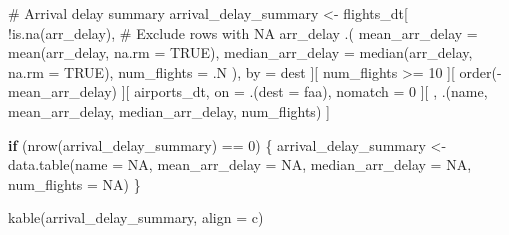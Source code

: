 \documentclass[
  12pt,
]{article}
\newenvironment{Shaded}{\begin{snugshade}}{\end{snugshade}}
\newcommand{\AttributeTok}[1]{\textcolor[rgb]{0.40,0.45,0.13}{#1}}
\newcommand{\CommentTok}[1]{\textcolor[rgb]{0.37,0.37,0.37}{#1}}
\newcommand{\ConstantTok}[1]{\textcolor[rgb]{0.56,0.35,0.01}{#1}}
\newcommand{\ControlFlowTok}[1]{\textcolor[rgb]{0.00,0.23,0.31}{\textbf{#1}}}
\newcommand{\DecValTok}[1]{\textcolor[rgb]{0.68,0.00,0.00}{#1}}
\newcommand{\FunctionTok}[1]{\textcolor[rgb]{0.28,0.35,0.67}{#1}}
\newcommand{\NormalTok}[1]{\textcolor[rgb]{0.00,0.23,0.31}{#1}}
\newcommand{\OtherTok}[1]{\textcolor[rgb]{0.00,0.23,0.31}{#1}}
\newcommand{\SpecialCharTok}[1]{\textcolor[rgb]{0.37,0.37,0.37}{#1}}
\newcommand{\StringTok}[1]{\textcolor[rgb]{0.13,0.47,0.30}{#1}}
\begin{document}
\begin{Shaded}
\begin{Highlighting}[]
\CommentTok{\# Arrival delay summary}
\NormalTok{arrival\_delay\_summary }\OtherTok{\textless{}{-}}\NormalTok{ flights\_dt[}
  \SpecialCharTok{!}\FunctionTok{is.na}\NormalTok{(arr\_delay), }\CommentTok{\# Exclude rows with NA arr\_delay}
\NormalTok{  .(}
    \AttributeTok{mean\_arr\_delay =} \FunctionTok{mean}\NormalTok{(arr\_delay, }\AttributeTok{na.rm =} \ConstantTok{TRUE}\NormalTok{),}
    \AttributeTok{median\_arr\_delay =} \FunctionTok{median}\NormalTok{(arr\_delay, }\AttributeTok{na.rm =} \ConstantTok{TRUE}\NormalTok{),}
    \AttributeTok{num\_flights =}\NormalTok{ .N}
\NormalTok{  ), by }\OtherTok{=}\NormalTok{ dest}
\NormalTok{][}
\NormalTok{  num\_flights }\SpecialCharTok{\textgreater{}=} \DecValTok{10}
\NormalTok{][}
  \FunctionTok{order}\NormalTok{(}\SpecialCharTok{{-}}\NormalTok{mean\_arr\_delay)}
\NormalTok{][}
\NormalTok{  airports\_dt, on }\OtherTok{=}\NormalTok{ .(}\AttributeTok{dest =}\NormalTok{ faa), nomatch }\OtherTok{=} \DecValTok{0}
\NormalTok{][}
\NormalTok{  , .(name, mean\_arr\_delay, median\_arr\_delay, num\_flights) }
\NormalTok{]}

\ControlFlowTok{if}\NormalTok{ (}\FunctionTok{nrow}\NormalTok{(arrival\_delay\_summary) }\SpecialCharTok{==} \DecValTok{0}\NormalTok{) \{}
\NormalTok{  arrival\_delay\_summary }\OtherTok{\textless{}{-}} \FunctionTok{data.table}\NormalTok{(}\AttributeTok{name =} \ConstantTok{NA}\NormalTok{, }\AttributeTok{mean\_arr\_delay =} \ConstantTok{NA}\NormalTok{, }
                                      \AttributeTok{median\_arr\_delay =} \ConstantTok{NA}\NormalTok{, }\AttributeTok{num\_flights =} \ConstantTok{NA}\NormalTok{)}
\NormalTok{\}}

\FunctionTok{kable}\NormalTok{(arrival\_delay\_summary, }\AttributeTok{align =} \StringTok{\textquotesingle{}c\textquotesingle{}}\NormalTok{)}
\end{Highlighting}
\end{Shaded}
\end{document}
